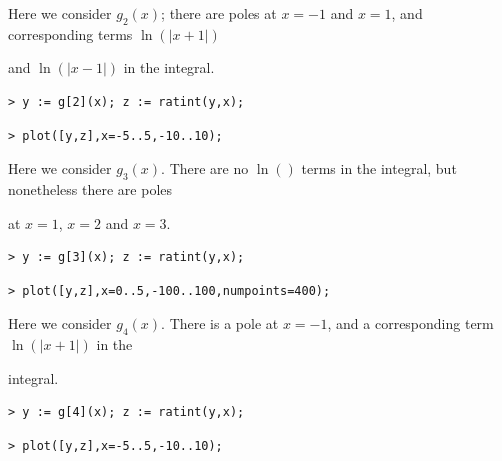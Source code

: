 \documentclass{article}
\begin{document}
\begin{Maple Normal}

\end{Maple Normal}
\begin{Maple Normal}
Here we consider 
$g_{2}(x)$; there are poles at 
$x =-1$ and 
$x =1$, and corresponding terms 
$\ln ({| x +1|})$
\end{Maple Normal}
\begin{Maple Normal}
and 
$\ln ({| x -1|})$ in the integral.
\end{Maple Normal}
\begin{lstlisting}
> y := g[2](x); z := ratint(y,x);
\end{lstlisting}
\begin{lstlisting}
> plot([y,z],x=-5..5,-10..10);
\end{lstlisting}
\begin{Maple Normal}

\end{Maple Normal}
\begin{Maple Normal}

\end{Maple Normal}
\begin{Maple Normal}
Here we consider 
$g_{3}(x)$.   There are no 
$\ln ()$ terms in the integral, but nonetheless there are poles
\end{Maple Normal}
\begin{Maple Normal}
at 
$x =1$, 
$x =2$ and 
$x =3$.
\end{Maple Normal}
\begin{lstlisting}
> y := g[3](x); z := ratint(y,x);
\end{lstlisting}
\begin{lstlisting}
> plot([y,z],x=0..5,-100..100,numpoints=400);
\end{lstlisting}
\begin{Maple Normal}

\end{Maple Normal}
\begin{Maple Normal}
Here we consider 
$g_{4}(x)$.  There is a pole at 
$x =-1$, and a corresponding term 
$\ln ({| x +1|})$ in the
\end{Maple Normal}
\begin{Maple Normal}
integral.
\end{Maple Normal}
\begin{lstlisting}
> y := g[4](x); z := ratint(y,x);
\end{lstlisting}
\begin{lstlisting}
> plot([y,z],x=-5..5,-10..10);
\end{lstlisting}
\end{document}
